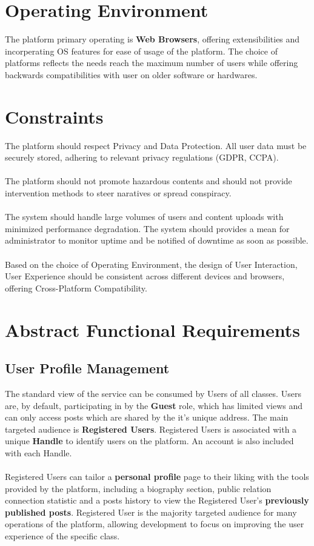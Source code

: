     \section{Operating Environment}
    The platform primary operating is \textbf{Web Browsers}, offering extensibilities and incorperating OS features for ease of usage of the platform.
    The choice of platforms reflects the needs reach the maximum number of users while offering backwards compatibilities with user on older software or hardwares.

    \section{Constraints}
    The platform should respect Privacy and Data Protection. All user data must be securely stored, adhering to relevant privacy regulations (GDPR, CCPA).
    \\\\
    The platform should not promote hazardous contents and should not provide intervention methods to steer naratives or spread conspiracy.
    \\\\
    The system should handle large volumes of users and content uploads with minimized performance degradation. The system should provides a mean for administrator to monitor uptime and be notified
    of downtime as soon as possible.
    \\\\
    Based on the choice of Operating Environment, the design of User Interaction, User Experience should be consistent across different devices and browsers, offering Cross-Platform Compatibility.

    \section{Abstract Functional Requirements}
        \subsection{User Profile Management}
        The standard view of the service can be consumed by Users of all classes. Users are, by default, participating in by the \textbf{Guest} role, which has limited views and
        can only access posts which are shared by the it's unique address. The main targeted audience is \textbf{Registered Users}. Registered Users is associated with
        a unique \textbf{Handle} to identify users on the platform. An account is also included with each Handle.
        \\\\
        Registered Users can tailor a \textbf{personal profile} page to their liking with the tools provided by the platform, including a biography section, public relation
        connection statistic and a posts history to view the Registered User's \textbf{previously published posts}. Registered User is the majority targeted audience for 
        many operations of the platform, allowing development to focus on improving the user experience of the specific class.

